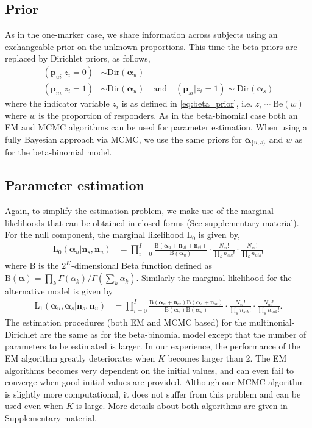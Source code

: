 \documentclass[11pt]{article}
\begin{document}
\subsection{Prior}
As in the one-marker case, we share information across subjects using an exchangeable prior on the unknown proportions. This time the beta priors are replaced by Dirichlet priors, as follows,
\begin{align}
(\mathbf{p}_{ui}|z_i=0) &\sim \mathrm{Dir}(\boldsymbol{\alpha}_u)\\\nonumber
(\mathbf{p}_{ui}|z_i=1) &\sim \mathrm{Dir}(\boldsymbol{\alpha}_u) \quad \text{and}\quad (\mathbf{p}_{si}|z_i=1) \sim \mathrm{Dir}(\boldsymbol{\alpha}_s)\label{eq:dir_prior}
\end{align}
where the indicator variable $z_i$ is as defined in \eqref{eq:beta_prior}, i.e. $z_i\sim\mathrm{Be}(w)$ where $w$ is the proportion of responders. As in the beta-binomial case both an EM and MCMC algorithms can be used for parameter estimation. When using a fully Bayesian approach via MCMC, we use the same priors for $\boldsymbol{\alpha}_{\{u,s\}}$ and $w$ as for the beta-binomial model. 

\subsection{Parameter estimation}
Again, to simplify the estimation problem, we make use of the marginal likelihoods that can be obtained in closed forms (See supplementary material). For the null component, the marginal likelihood $\mathrm{L}_0$ is given by,
\begin{align}
\mathrm{L}_0(\boldsymbol{\alpha}_u|\mathbf{n}_s,\mathbf{n}_u) &= \prod_{i=0}^I\frac{ \mathrm{B}(\boldsymbol{\alpha}_{u}+\mathbf{n}_{ui}+\mathbf{n}_{si})}{\mathrm{B}(\boldsymbol{\alpha}_u)} \cdot \frac{N_{si}!}{\prod_k n_{sik}!} \cdot \frac{N_{ui}!}{\prod_k n_{uik}!}
\end{align}
where $\mathrm{B}$ is the $2^K$-dimensional Beta function defined as $\mathrm{B}(\boldsymbol{\alpha})=\prod_k\Gamma(\alpha_k)/\Gamma(\sum_k\alpha_k)$. Similarly the marginal likelihood for the alternative model is given by 
\begin{align}
\mathrm{L}_1(\boldsymbol{\alpha}_u,\boldsymbol{\alpha}_s|\mathbf{n}_s,\mathbf{n}_u) &= \prod_{i=0}^I\frac{\mathrm{B}(\boldsymbol{\alpha}_{u}+\mathbf{n}_{ui}) \mathrm{B}(\boldsymbol{\alpha}_{s}+\mathbf{n}_{si})}{\mathrm{B}(\boldsymbol{\alpha}_s)\mathrm{B}(\boldsymbol{\alpha}_u)} \cdot \frac{N_{si}!}{\prod_k n_{sik}!} \cdot \frac{N_{ui}!}{\prod_k n_{uik}!}.\label{eq:postmult}
\end{align}
The estimation procedures (both EM and MCMC based) for the multinonial-Dirichlet are the same as for the beta-binomial model except that the number of parameters to be estimated is larger. In our experience, the performance of the EM algorithm greatly deteriorates when $K$ becomes larger than 2. The EM algorithms becomes very dependent on the initial values, and can even fail to converge when good initial values are provided. Although our MCMC algorithm is slightly more computational, it does not suffer from this problem and can be used even when $K$ is large. More details about both algorithms are given in Supplementary material. 
\end{document}
